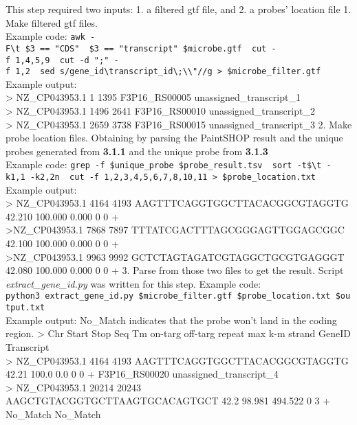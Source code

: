 \documentclass[
]{article}
\begin{document}
This step required two inputs: 1. a filtered gtf file, and 2. a probes'
location file 1. Make filtered gtf files.\\
Example code:
\texttt{awk\ -F\textquotesingle{}\textbackslash{}t\textquotesingle{}\ \textquotesingle{}\$3\ ==\ "CDS"\ \textbar{}\textbar{}\ \$3\ ==\ "transcript"\textquotesingle{}\ \$microbe.gtf\ \textbar{}\ cut\ -f\ 1,4,5,9\ \textbar{}\ cut\ -d\ ";"\ -f\ 1,2\ \textbar{}\ sed\ \textquotesingle{}s/gene\_id\textbackslash{}\textbar{}transcript\_id\textbackslash{}\textbar{};\textbackslash{}\textbar{}\textbackslash{}"//g\textquotesingle{}\ \textgreater{}\ \$microbe\_filter.gtf}\\
Example output:\\
\textgreater{} NZ\_CP043953.1 1 1395 F3P16\_RS00005
unassigned\_transcript\_1\\
\textgreater{} NZ\_CP043953.1 1496 2641 F3P16\_RS00010
unassigned\_transcript\_2\\
\textgreater{} NZ\_CP043953.1 2659 3738 F3P16\_RS00015
unassigned\_transcript\_3 2. Make probe location files. Obtaining by
parsing the PaintSHOP result and the unique probes generated from
\textbf{3.1.1} and the unique probe from \textbf{3.1.3}\\
Example code:
\texttt{grep\ -f\ \$unique\_probe\ \$probe\_result.tsv\ \textbar{}\ sort\ -t\$\textquotesingle{}\textbackslash{}t\textquotesingle{}\ -k1,1\ -k2,2n\ \textbar{}\ cut\ -f\ 1,2,3,4,5,6,7,8,10,11\ \textgreater{}\ \$probe\_location.txt}
Example output:\\
\textgreater{} NZ\_CP043953.1 4164 4193 AAGTTTCAGGTGGCTTACACGGCGTAGGTG
42.210 100.000 0.000 0 0 +\\
\textgreater NZ\_CP043953.1 7868 7897 TTTATCGACTTTAGCGGGAGTTGGAGCGGC
42.100 100.000 0.000 0 0 +\\
\textgreater NZ\_CP043953.1 9963 9992 GCTCTAGTAGATCGTAGGCTGCGTGAGGGT
42.080 100.000 0.000 0 0 + 3. Parse from those two files to get the
result. Script \emph{extract\_gene\_id.py} was written for this step.
Example code:
\texttt{python3\ extract\_gene\_id.py\ \$microbe\_filter.gtf\ \$probe\_location.txt\ \$output.txt}\\
Example output: No\_Match indicates that the probe won't land in the
coding region. \textgreater{} Chr Start Stop Seq Tm on-targ off-targ
repeat max k-m strand GeneID Transcript\\
\textgreater{} NZ\_CP043953.1 4164 4193 AAGTTTCAGGTGGCTTACACGGCGTAGGTG
42.21 100.0 0.0 0 0 + F3P16\_RS00020 unassigned\_transcript\_4\\
\textgreater{} NZ\_CP043953.1 20214 20243 AAGCTGTACGGTGCTTAAGTGCACAGTGCT
42.2 98.981 494.522 0 3 + No\_Match No\_Match
\end{document}
